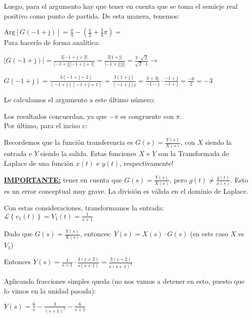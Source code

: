 \documentclass[11pt]{article}
\def\imj{\mathrm{j}}
\newcommand{\lapl}[1]{\mathscr{L} \left\lbrace {#1} \right\rbrace}
\begin{document}
	Luego, para el argumento hay que tener en cuenta que se toma el semieje real positivo como punto de partida. De esta manera, tenemos:
	
	$\displaystyle \text{Arg}[G(-1+\imj)]= \frac{\pi}{4} - \left(\frac{\pi}{2} + \frac{3}{4}\pi \right)=$ \\
	
	Para hacerlo de forma analítica:
	
	$\displaystyle |G(-1+\imj)|=\frac{3|-1+\imj+2|}{|-1+\imj||-1+\imj+1|}=\frac{3|1+\imj|}{|-1+\imj||\imj|}=\frac{3 \cdot \sqrt{2}}{\sqrt{2} \cdot 1} \rightarrow$ \fcolorbox{black}{yellow}{$|G(-1+\imj)|=3$}
	
	$\displaystyle G(-1+\imj)=\frac{3(-1+\imj+2)}{(-1+\imj)(-1+\imj+1)}=\frac{3(1+\imj)}{(-1+\imj)\imj}=\frac{3+3\imj}{-1-\imj}\cdot\frac{-1+\imj}{-1+\imj}=\frac{-6}{2}=-3$
	
	Le calculamos el argumento a este último número: 
	
	Los resultados concuerdan, ya que $-\pi$ es congruente con $\pi$.\\
	
	Por último, para el inciso c:
	
	Recordemos que la función transferencia es $\displaystyle G(s)=\frac{Y(s)}{X(s)}$, con $X$ siendo la entrada e $Y$ siendo la salida. Estas funciones $X$ e $Y$ son la Transformada de Laplace de una función $x(t)$ e $y(t)$, respectivamente!
	
	\textbf{\underline{IMPORTANTE:}} tener en cuenta que $\displaystyle G(s)=\frac{Y(s)}{X(s)}$, pero $\displaystyle g(t)\neq\frac{y(t)}{x(s)}$. Esto es un error conceptual muy grave. La división es válida en el dominio de Laplace.
	
	Con estas consideraciones, transformamos la entrada: $\displaystyle \lapl{v_1(t)}=V_1(t)=\frac{1}{s+1}$
	
	Dado que $\displaystyle G(s)=\frac{Y(s)}{X(s)}$, entonces: $\displaystyle Y(s)=X(s)\cdot G(s)$ (en este caso $X$ es $V_1$)
	
	Entonces $\displaystyle Y(s)=\frac{1}{s+1} \cdot \frac{3(s+2)}{s(s+1)}=\frac{3(s+2)}{s(s+1)^2}$
	
	Aplicando fracciones simples queda (no nos vamos a detener en esto, puesto que lo vimos en la unidad pasada):
	
	$\displaystyle Y(s)=\frac{6}{s}-\frac{3}{(s+1)^2}-\frac{6}{s+1}$
	
\end{document}
